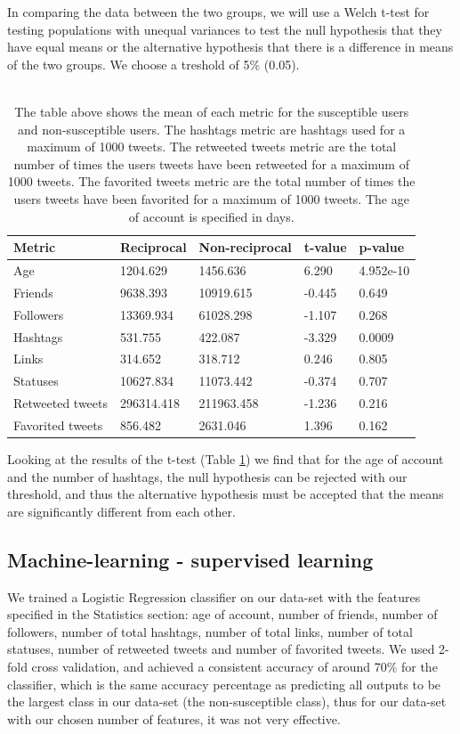 \documentclass[10pt]{IEEEtran}
\begin{document}
In comparing the data between the two groups, we will use a Welch t-test for testing populations with unequal variances to test the null hypothesis that they have equal means or the alternative hypothesis that there is a difference in means of the two groups.
We choose a treshold of 5\% (0.05).
\\\\
\begin{table}[H]
\centering
\begin{tabular}{lllll}
\hline
Metric & Reciprocal & Non-reciprocal & t-value & p-value \\ \hline
Age & 1204.629 & 1456.636 & 6.290 & 4.952e-10\\
Friends & 9638.393 & 10919.615 & -0.445 & 0.649 \\
Followers & 13369.934 & 61028.298 & -1.107 & 0.268 \\
Hashtags & 531.755 & 422.087 & -3.329 & 0.0009 \\
Links & 314.652 & 318.712 & 0.246 & 0.805 \\
Statuses & 10627.834 & 11073.442 & -0.374 & 0.707 \\
Retweeted tweets & 296314.418 & 211963.458 & -1.236 & 0.216 \\
Favorited tweets & 856.482 & 2631.046 & 1.396 & 0.162 \\ \hline
\end{tabular}
\caption{The table above shows the mean of each metric for the susceptible users and non-susceptible users. The hashtags metric are hashtags used for a maximum of 1000 tweets. The retweeted tweets metric are the total number of times the users tweets have been retweeted for a maximum of 1000 tweets. The favorited tweets metric are the total number of times the users tweets have been favorited for a maximum of 1000 tweets. The age of account is specified in days.}
\label{tab:t_test}
\end{table}
Looking at the results of the t-test (Table \ref{tab:t_test}) we find that for the age of account and the number of hashtags, the null hypothesis can be rejected with our threshold, and thus the alternative hypothesis must be accepted that the means are significantly different from each other.\\

\subsection{Machine-learning - supervised learning}
We trained a Logistic Regression classifier on our data-set with the features specified in the Statistics section: age of account, number of friends, number of followers, number of total hashtags, number of total links, number of total statuses, number of retweeted tweets and number of favorited tweets. We used 2-fold cross validation, and achieved a consistent accuracy of around 70\% for the classifier, which is the same accuracy percentage as predicting all outputs to be the largest class in our data-set (the non-susceptible class), thus for our data-set with our chosen number of features, it was not very effective.  
\end{document}
